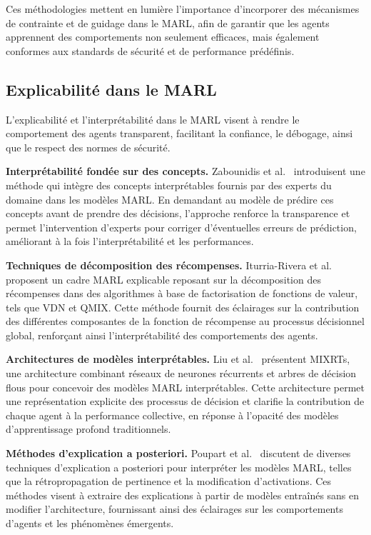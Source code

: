 \documentclass[pdflatex,sn-mathphys-num]{sn-jnl}%
\theoremstyle{thmstyleone}%
\theoremstyle{thmstyletwo}%
\theoremstyle{thmstylethree}%
\begin{document}
Ces méthodologies mettent en lumière l'importance d'incorporer des mécanismes de contrainte et de guidage dans le MARL, afin de garantir que les agents apprennent des comportements non seulement efficaces, mais également conformes aux standards de sécurité et de performance prédéfinis.


\subsection{Explicabilité dans le MARL}\label{sub-sec:rel_evaluation}

L'explicabilité et l'interprétabilité dans le MARL visent à rendre le comportement des agents transparent, facilitant la confiance, le débogage, ainsi que le respect des normes de sécurité.

\textbf{Interprétabilité fondée sur des concepts.} Zabounidis et al.~\cite{zabounidis2023concept} introduisent une méthode qui intègre des concepts interprétables fournis par des experts du domaine dans les modèles MARL. En demandant au modèle de prédire ces concepts avant de prendre des décisions, l'approche renforce la transparence et permet l'intervention d'experts pour corriger d'éventuelles erreurs de prédiction, améliorant à la fois l'interprétabilité et les performances.

\textbf{Techniques de décomposition des récompenses.} Iturria-Rivera et al.~\cite{iturria2024explainable} proposent un cadre MARL explicable reposant sur la décomposition des récompenses dans des algorithmes à base de factorisation de fonctions de valeur, tels que VDN et QMIX. Cette méthode fournit des éclairages sur la contribution des différentes composantes de la fonction de récompense au processus décisionnel global, renforçant ainsi l'interprétabilité des comportements des agents.

\textbf{Architectures de modèles interprétables.} Liu et al.~\cite{liu2022mixrts} présentent MIXRTs, une architecture combinant réseaux de neurones récurrents et arbres de décision flous pour concevoir des modèles MARL interprétables. Cette architecture permet une représentation explicite des processus de décision et clarifie la contribution de chaque agent à la performance collective, en réponse à l'opacité des modèles d'apprentissage profond traditionnels.

\textbf{Méthodes d'explication a posteriori.} Poupart et al.~\cite{poupart2025perspectives} discutent de diverses techniques d'explication a posteriori pour interpréter les modèles MARL, telles que la rétropropagation de pertinence et la modification d'activations. Ces méthodes visent à extraire des explications à partir de modèles entraînés sans en modifier l'architecture, fournissant ainsi des éclairages sur les comportements d'agents et les phénomènes émergents.
\end{document}
